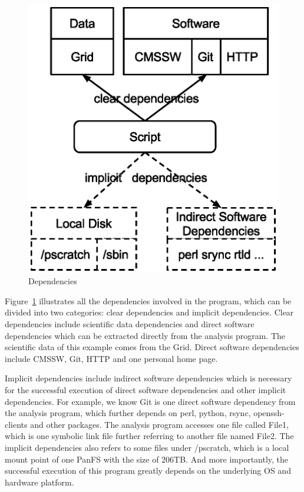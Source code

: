 \documentclass{acm_proc_article-sp}
\begin{document}
\begin{figure}[t]
\centering
\includegraphics[width=.8\columnwidth]{dependencies.eps}
\caption{Dependencies}
\label{fig:dependencies}
\end{figure}

Figure~\ref{fig:dependencies} illustrates all the dependencies
involved in the program, which can be divided into two categories: clear
dependencies and implicit dependencies. Clear dependencies include scientific data
dependencies and direct software dependencies which can be extracted directly
from the analysis program. The scientific data of this example comes from the Grid. Direct software dependencies include CMSSW, Git, HTTP and one personal home page. 

Implicit dependencies include indirect software
dependencies which is necessary for the successful execution of direct software
dependencies and other implicit dependencies. For example, we know Git is one
direct software dependency from the analysis program, which further depends on
perl, python, rsync, openssh-clients and other packages. The analysis program
accesses one file called File1, which is one symbolic link file further referring to
another file named File2.
The implicit dependencies also refers to some files under /pscratch, which is a local mount point of one PanFS with the size of 206TB.
And more importantly, the successful execution of this program greatly depends on the underlying OS and hardware platform.
\end{document}
